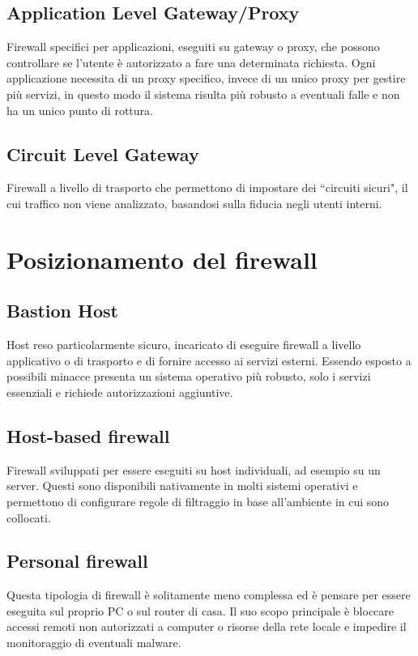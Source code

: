 \documentclass[a4paper, 11pt, twoside, openright, fleqn]{report}
\begin{document}
\subsection{Application Level Gateway/Proxy}
Firewall specifici per applicazioni, eseguiti su gateway o proxy, che possono controllare se l'utente è autorizzato a fare una determinata richiesta. Ogni applicazione necessita di un proxy specifico, invece di un unico proxy per gestire più servizi, in questo modo il sistema risulta più robusto a eventuali falle e non ha un unico punto di rottura.

\subsection{Circuit Level Gateway}
Firewall a livello di trasporto che permettono di impostare dei ``circuiti sicuri", il cui traffico non viene analizzato, basandosi sulla fiducia negli utenti interni.

\section{Posizionamento del firewall}
\subsection{Bastion Host}
Host reso particolarmente sicuro, incaricato di eseguire firewall a livello applicativo o di trasporto e di fornire accesso ai servizi esterni. Essendo esposto a possibili minacce presenta un sistema operativo più robusto, solo i servizi essenziali e richiede autorizzazioni aggiuntive.

\subsection{Host-based firewall}
Firewall sviluppati per essere eseguiti su host individuali, ad esempio su un server. Questi sono disponibili nativamente in molti sistemi operativi e permettono di configurare regole di filtraggio in base all'ambiente in cui sono collocati.

\subsection{Personal firewall}
Questa tipologia di firewall è solitamente meno complessa ed è pensare per essere eseguita sul proprio PC o sul router di casa. Il suo scopo principale è bloccare accessi remoti non autorizzati a computer o risorse della rete locale e impedire il monitoraggio di eventuali malware.
\end{document}

